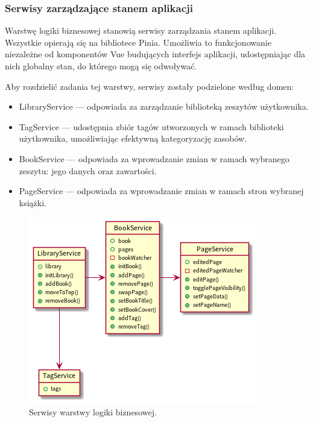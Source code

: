 \subsubsection{Serwisy zarządzające stanem aplikacji}
Warstwę logiki biznesowej stanowią serwisy zarządzania stanem aplikacji.
Wszystkie opierają się na bibliotece Pinia.
Umożliwia to funkcjonowanie niezależne od komponentów Vue budujących interfejs aplikacji,
udostępniając dla nich globalny stan, do którego mogą się odwoływać.

Aby rozdzielić zadania tej warstwy, serwisy zostały podzielone według domen:
\begin{itemize}
	\item LibraryService — odpowiada za zarządzanie biblioteką zeszytów użytkownika.
	\item TagService — udostępnia zbiór tagów utworzonych w ramach biblioteki użytkownika, umożliwiając efektywną kategoryzację zasobów.
	\item BookService — odpowiada za wprowadzanie zmian w ramach wybranego zeszytu: jego danych oraz zawartości.
	\item PageService — odpowiada za wprowadzanie zmian w ramach stron wybranej książki.
\end{itemize}

\begin{figure}[H]
	\begin{center}
		\includegraphics[scale=0.9]{media/LogicLayer.png}
	\end{center}
	\caption{Serwisy warstwy logiki biznesowej.}
	\label{rys:logic-layer}
\end{figure}

